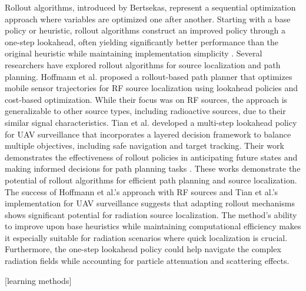 \documentclass[../report.tex]{subfiles}
\begin{document}
    Rollout algorithms, introduced by Bertsekas, represent a sequential optimization approach where variables are optimized one after another. Starting with a base policy or heuristic, rollout
    algorithms construct an improved policy through a one-step lookahead, often yielding significantly better performance than the original heuristic while maintaining implementation 
    simplicity \cite{bertsekas2013rollout}. Several researchers have explored rollout algorithms for source localization and path planning. Hoffmann et al. proposed
    a rollout-based path planner that optimizes mobile sensor trajectories for RF source localization using lookahead policies and cost-based optimization. While their focus was on RF sources, 
    the approach is generalizable to other source types, including radioactive sources, due to their similar signal characteristics\cite{rolloutHoffmann2019}. Tian et al. developed 
    a multi-step lookahead policy for UAV surveillance that incorporates a layered decision framework to balance multiple objectives, including safe navigation and target tracking. Their work 
    demonstrates the effectiveness of rollout policies in anticipating future states and making informed decisions for path planning tasks \cite{rolloutMultiStepLookaheadTian2008}. 
    These works demonstrate the potential of rollout algorithms for efficient path planning and source localization. The success of Hoffmann et al.'s approach with RF sources and Tian et al.'s implementation
    for UAV surveillance suggests that adapting rollout mechanisms shows significant potential for radiation source localization. The method's ability to improve upon base heuristics while
    maintaining computational efficiency makes it especially suitable for radiation scenarios where quick localization is crucial. Furthermore, the one-step lookahead policy could help navigate 
    the complex radiation fields while accounting for particle attenuation and scattering effects.
    
    [learning methods]
\end{document}
